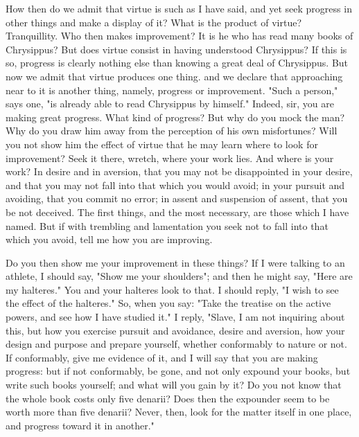 \documentclass[a4paper]{article}
\begin{document}
How then do we admit that virtue is such as I have said, and yet seek
progress in other things and make a display of it? What is the product
of virtue? Tranquillity. Who then makes improvement? It is he who
has read many books of Chrysippus? But does virtue consist in having
understood Chrysippus? If this is so, progress is clearly nothing
else than knowing a great deal of Chrysippus. But now we admit that
virtue produces one thing. and we declare that approaching near to
it is another thing, namely, progress or improvement. "Such a person,"
says one, "is already able to read Chrysippus by himself." Indeed,
sir, you are making great progress. What kind of progress? But why
do you mock the man? Why do you draw him away from the perception
of his own misfortunes? Will you not show him the effect of virtue
that he may learn where to look for improvement? Seek it there, wretch,
where your work lies. And where is your work? In desire and in aversion,
that you may not be disappointed in your desire, and that you may
not fall into that which you would avoid; in your pursuit and avoiding,
that you commit no error; in assent and suspension of assent, that
you be not deceived. The first things, and the most necessary, are
those which I have named. But if with trembling and lamentation you
seek not to fall into that which you avoid, tell me how you are improving.

Do you then show me your improvement in these things? If I were talking
to an athlete, I should say, "Show me your shoulders"; and then he
might say, "Here are my halteres." You and your halteres look to that.
I should reply, "I wish to see the effect of the halteres." So, when
you say: "Take the treatise on the active powers, and see how I have
studied it." I reply, "Slave, I am not inquiring about this, but how
you exercise pursuit and avoidance, desire and aversion, how your
design and purpose and prepare yourself, whether conformably to nature
or not. If conformably, give me evidence of it, and I will say that
you are making progress: but if not conformably, be gone, and not
only expound your books, but write such books yourself; and what will
you gain by it? Do you not know that the whole book costs only five
denarii? Does then the expounder seem to be worth more than five denarii?
Never, then, look for the matter itself in one place, and progress
toward it in another." 
\end{document}
